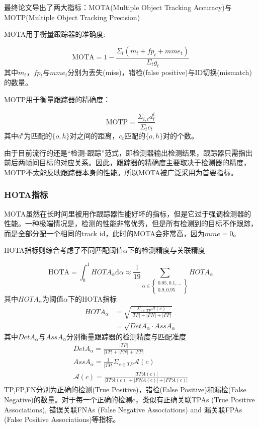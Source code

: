 最终论文导出了两大指标：MOTA(Multiple Object Tracking Accuracy)与MOTP(Multiple Object Tracking Precision)

MOTA用于衡量跟踪器的准确度:

\begin{equation}
    \text{MOTA}=1-\frac{\Sigma_t(m_t+fp_t+mme_t)}{\Sigma_tg_t}
\end{equation}
其中$m_t$，$fp_t$与$mme_t$分别为丢失(miss)，错检(false positive)与ID切换(mismatch)的数量。

MOTP用于衡量跟踪器的精确度：

\begin{equation}
    \text{MOTP}=\frac{\Sigma_{i,t}d_t^i}{\Sigma_tc_t}
\end{equation}
其中$d^i$为匹配的$\{o,h\}$对之间的距离，$c_t$匹配的$\{o,h\}$对的个数。

由于目前流行的还是“检测-跟踪”范式，即检测器输出检测结果，跟踪器只需指出前后两帧间目标的对应关系。因此，跟踪器的精确度主要取决于检测器的精度，MOTP不太能反映跟踪器本身的性能。所以MOTA被广泛采用为首要指标。

\subsubsection{HOTA指标}

MOTA虽然在长时间里被用作跟踪器性能好坏的指标，但是它过于强调检测器的性能。一种极端情况是，检测的性能非常优秀，但是所有检测到的目标不作跟踪，而是全部分配一个相同的track id，此时的MOTA会非常高，因为$mme=0$。

HOTA指标则综合考虑了不同匹配阈值$\alpha$下的检测精度与关联精度

\begin{equation}
    \mathrm{HOTA}=\int_{0}^{1} HOTA_{\alpha} \mathrm{d} \alpha \approx \frac{1}{19} \sum_{\alpha \in\left\{\begin{array}{c}
        0.05,0.1, \ldots \\
        0.9,0.95
        \end{array}\right\}} HOTA_{\alpha}
\end{equation}
其中$HOTA_{\alpha}$为阈值$\alpha$下的HOTA指标
\begin{eqnarray}
    HOTA_{\alpha}
    & =\sqrt{\displaystyle\frac{\Sigma_{c\in{TP}}\mathcal{A}(c)}{|TP|+|FN|+|FP|}}\\
    & =\sqrt{\displaystyle DetA_\alpha\cdot AssA_\alpha}
\end{eqnarray}
其中$DetA_\alpha$与$AssA_\alpha$分别衡量跟踪器的检测精度与匹配准度
\begin{eqnarray}
    DetA_\alpha=\frac{|TP|}{|TP|+|FN|+|FP|}\\
    AssA_\alpha=\frac{1}{|TP|}\Sigma_{c\in{TP}}\mathcal{A}(c)\\
    \mathcal{A}(c)=\frac{|TPA(c)|}{|TPA(c)|+|FNA(c)|+|FPA(c)|}
\end{eqnarray}
TP,FP,FN分别为正确的检测(True Positive)，错检(False Positive)和漏检(False Negative)的数量。对于每一个正确的检测c，类似有正确关联TPAs (True Positive Associations), 错误关联FNAs (False Negative Associations) and 漏关联FPAs (False Positive Associations)等指标。

